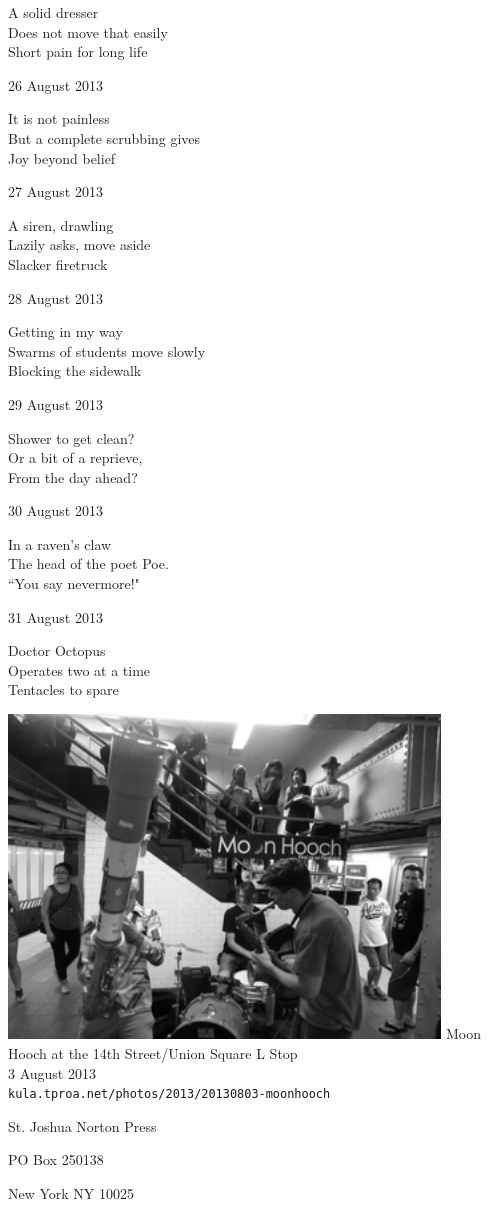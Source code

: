 \documentclass[12pt]{article}
\begin{document}
A solid dresser \\
Does not move that easily \\
Short pain for long life

26 August 2013

It is not painless \\
But a complete scrubbing gives \\
Joy beyond belief 

27 August 2013

A siren, drawling \\
Lazily asks, move aside \\
Slacker firetruck

28 August 2013

Getting in my way \\
Swarms of students move slowly \\
Blocking the sidewalk

29 August 2013

Shower to get clean? \\
Or a bit of a reprieve, \\
From the day ahead?

30 August 2013

In a raven's claw \\
The head of the poet Poe. \\
``You say nevermore!"

31 August 2013

Doctor Octopus \\
Operates two at a time \\
Tentacles to spare

\newpage

\begin{center}
\includegraphics[width=325pt]{moon-hooch.png}
Moon Hooch at the 14th Street/Union Square L Stop \\
3 August 2013 \\
{\tt kula.tproa.net/photos/2013/20130803-moonhooch }
\end{center}

\newpage

\thispagestyle{empty}
\vspace*{12cm}
\begin{sideways}
\Large{St. Joshua Norton Press}
\end{sideways}
\begin{sideways}
\Large{PO Box 250138}
\end{sideways}
\begin{sideways}
\Large{New York NY 10025}
\end{sideways}
\end{document}
